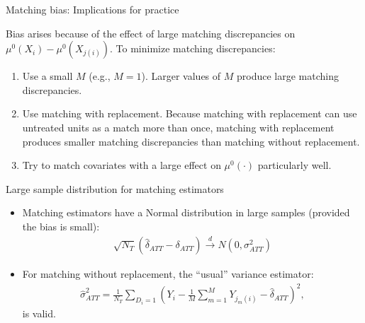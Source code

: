 \documentclass{beamer}
\begin{document}
\begin{frame}{Matching bias: Implications for practice}
	
Bias arises because of the effect of large matching discrepancies on $\mu^0(X_i) - \mu^0(X_{j(i)})$. To minimize matching discrepancies:
	\begin{enumerate}
	\item Use a small $M$ (e.g., $M=1$). Larger values of $M$ produce large matching discrepancies.
	\item Use matching with replacement.  Because matching with replacement can use untreated units as a match more than once, matching with replacement produces smaller matching discrepancies than matching without replacement.
	\item Try to match covariates with a large effect on $\mu^0(\cdot)$ particularly well.
	\end{enumerate}
\end{frame}

\begin{frame}{Large sample distribution for matching estimators}
	
	\begin{itemize}
	\item Matching estimators have a Normal distribution in large samples (provided the bias is small):
		\begin{eqnarray*}
		\sqrt{N_T} (\widehat{\delta}_{ATT} - \delta_{ATT}) \xrightarrow{d} N(0,\sigma^2_{ATT})
		\end{eqnarray*}
	\item For matching without replacement, the ``usual'' variance estimator:
		\begin{eqnarray*}
		\widehat{\sigma}^2_{ATT} = \frac{1}{N_T} \sum_{D_i=1} \left( Y_i - \frac{1}{M} \sum_{m=1}^M Y_{j_m(i)} - \widehat{\delta}_{ATT} \right)^2,
		\end{eqnarray*}is valid.
	\end{itemize}
\end{frame}
\end{document}
